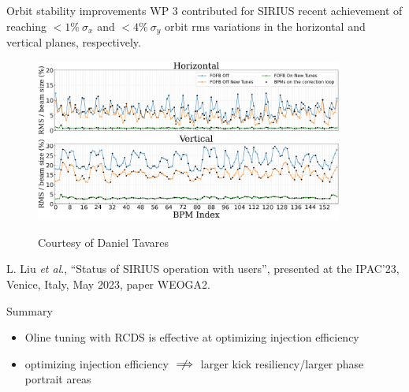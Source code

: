 \documentclass[aspectratio=169]{beamer}
\begin{document}
\begin{frame}{Orbit stability improvements}
WP 3 contributed for SIRIUS recent achievement of reaching $<1\%~\sigma_x$ and $<4\%~\sigma _y$ orbit rms variations in the horizontal and vertical planes, respectively.\\
\vfill
\begin{minipage}{0.7\textwidth}
    \begin{figure}
        \includegraphics[width=0.9\textwidth]{WEOGA2_f5.png}
            \begin{flushleft}
            \tiny Courtesy of Daniel Tavares
        \end{flushleft}
    \end{figure}
\end{minipage}
\hfill
\begin{minipage}{0.29\textwidth}
    \scriptsize
    L. Liu \emph{et al}., “Status of SIRIUS operation with users”,
presented at the IPAC’23, Venice, Italy, May 2023, paper
WEOGA2.
\end{minipage}
\end{frame}
\begin{frame}{Summary}
    \begin{itemize}
    \item Oline tuning with RCDS is effective at optimizing injection efficiency
    \item  optimizing injection efficiency $\centernot\implies$ larger kick resiliency/larger phase portrait areas
\end{itemize}

\end{frame}
\end{document}
